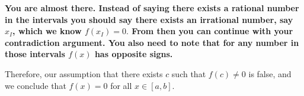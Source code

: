 \documentclass{report}
\begin{document}
\textbf{You are almost there. Instead of saying there exists a rational number in the intervals you should say there exists an irrational number, say $x_I$, which we know $f(x_I)=0.$ From then you can continue with your contradiction argument. You also need to note that for any number in those intervals $f(x)$ has opposite signs.}

Therefore, our assumption that there exists $c$ such that $f(c) \neq 0$ is false, and we conclude that $f(x)=0$ for all $x \in[a, b]$.
\end{document}
